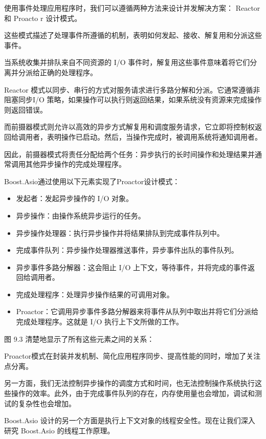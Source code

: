 使用事件处理应用程序时，我们可以遵循两种方法来设计并发解决方案： Reactor 和 Proacto r 设计模式。

这些模式描述了处理事件所遵循的机制，表明如何发起、接收、解复用和分派这些事件。

当系统收集并排队来自不同资源的 I/O 事件时，解复用这些事件意味着将它们分离并分派给正确的处理程序。

Reactor 模式以同步、串行的方式对服务请求进行多路分解和分派。它通常遵循非阻塞同步I/O 策略，如果操作可以执行则返回结果，如果系统没有资源来完成操作则返回错误。

而前摄器模式则允许以高效的异步方式解复用和调度服务请求，它立即将控制权返回给调用者，表明操作已启动。然后，当操作完成时，被调用系统将通知调用者。

因此，前摄器模式将责任分配给两个任务：异步执行的长时间操作和处理结果并通常调用其他异步操作的完成处理程序。

Boost.Asio通过使用以下元素实现了Proactor设计模式：

\begin{itemize}
\item
发起者：发起异步操作的 I/O 对象。

\item
异步操作：由操作系统异步运行的任务。

\item
异步操作处理器：执行异步操作并将结果排队到完成事件队列中。

\item
完成事件队列：异步操作处理器推送事件，异步事件出队的事件队列。

\item
异步事件多路分解器：这会阻止 I/O 上下文，等待事件，并将完成的事件返回给调用者。

\item
完成处理程序：处理异步操作结果的可调用对象。

\item
Proactor：它调用异步事件多路分解器来将事件从队列中取出并将它们分派给完成处理程序。这就是 I/O 执行上下文所做的工作。
\end{itemize}

图 9.3 清楚地显示了所有这些元素之间的关系：


Proactor模式在封装并发机制、简化应用程序同步、提高性能的同时，增加了关注点分离。

另一方面，我们无法控制异步操作的调度方式和时间，也无法控制操作系统执行这些操作的效率。此外，由于完成事件队列的存在，内存使用量也会增加，调试和测试的复杂性也会增加。

Boost.Asio 设计的另一个方面是执行上下文对象的线程安全性。现在让我们深入研究 Boost.Asio 的线程工作原理。
































